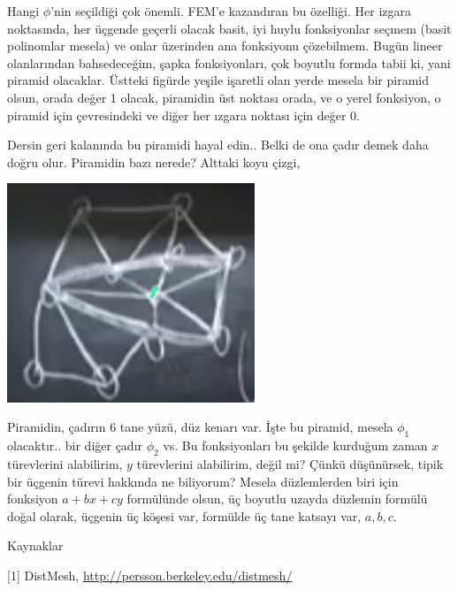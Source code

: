 \documentclass[12pt,fleqn]{article}\usepackage{../../common}
\begin{document}
Hangi $\phi$'nin seçildiği çok önemli. FEM'e kazandıran bu özelliği. Her izgara
noktasında, her üçgende geçerli olacak basit, iyi huylu fonksiyonlar seçmem
(basit polinomlar mesela) ve onlar üzerinden ana fonksiyonu çözebilmem.  Bugün
lineer olanlarından bahsedeceğim, şapka fonksiyonları, çok boyutlu formda tabii
ki, yani piramid olacaklar. Üstteki figürde yeşile işaretli olan yerde mesela
bir piramid olsun, orada değer 1 olacak, piramidin üst noktası orada, ve
o yerel fonksiyon, o piramid için çevresindeki ve diğer her ızgara noktası için
değer 0. 

Dersin geri kalanında bu piramidi hayal edin.. Belki de ona çadır demek daha
doğru olur. Piramidin bazı nerede? Alttaki koyu çizgi,

\includegraphics[width=20em]{compscieng_1_26_02.png}

Piramidin, çadırın 6 tane yüzü, düz kenarı var. İşte bu piramid, mesela $\phi_1$
olacaktır.. bir diğer çadır $\phi_2$ vs. Bu fonksiyonları bu şekilde kurduğum
zaman $x$ türevlerini alabilirim, $y$ türevlerini alabilirim, değil mi?
Çünkü düşünürsek, tipik bir üçgenin türevi hakkında ne biliyorum? Mesela
düzlemlerden biri için fonksiyon $a + bx + cy$ formülünde olsun, üç boyutlu
uzayda düzlemin formülü doğal olarak, üçgenin üç köşesi var, formülde üç tane
katsayı var, $a,b,c$. 











Kaynaklar

[1] DistMesh, \url{http://persson.berkeley.edu/distmesh/}
\end{document}
